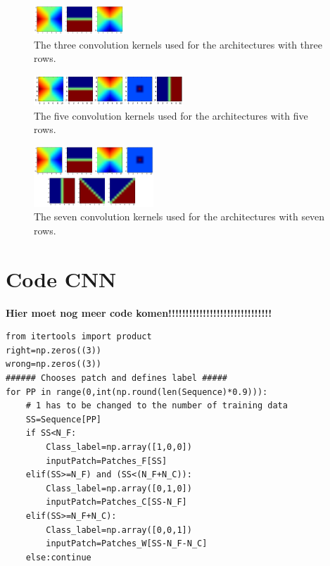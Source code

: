 \documentclass[a4paper,onecolumn]{report}
\begin{document}
\begin{appendices}
\begin{tiny}
\begin{center}
\begin{tabular}{| l |p{0.5cm} |p{0.5cm} |p{0.5cm} |p{0.75cm} |p{0.7cm} |p{0.7cm} |p{0.75cm} |p{0.75cm} |p{0.75cm} |p{0.5cm} |p{0.8cm} |p{0.8cm} |p{0.8cm} |r | }
			
		\end{tabular}
	\end{center}
\end{tiny}	


\begin{figure}[bth!]
	\centering
	\includegraphics[width=0.3\textwidth]{./images/3filters.jpg}
	\caption{The three convolution kernels used for the architectures with three rows.}
	\label{fig:3filters}
\end{figure}

\begin{figure}[bth!]
	\centering
	\includegraphics[width=0.5\textwidth]{./images/5filters.jpg}
	\caption{The five convolution kernels used for the architectures with five rows.}
	\label{fig:5filters}
\end{figure}

\begin{figure}[bth!]
	\centering
	\includegraphics[width=0.4\textwidth]{./images/7filters.jpg}
	\caption{The seven convolution kernels used for the architectures with seven rows.}
	\label{fig:7filters}
\end{figure}

	
	
\chapter{Code CNN}
\textbf{Hier moet nog meer code komen!!!!!!!!!!!!!!!!!!!!!!!!!!!!!!}

\begin{tiny}
\begin{verbatim}
from itertools import product
right=np.zeros((3))
wrong=np.zeros((3))
###### Chooses patch and defines label #####
for PP in range(0,int(np.round(len(Sequence)*0.9))):
    # 1 has to be changed to the number of training data
    SS=Sequence[PP]
    if SS<N_F:
        Class_label=np.array([1,0,0])
        inputPatch=Patches_F[SS]
    elif(SS>=N_F) and (SS<(N_F+N_C)):
        Class_label=np.array([0,1,0])
        inputPatch=Patches_C[SS-N_F]
    elif(SS>=N_F+N_C):
        Class_label=np.array([0,0,1])
        inputPatch=Patches_W[SS-N_F-N_C]
    else:continue


\end{verbatim}
\end{tiny}
\end{appendices}
\end{document}
